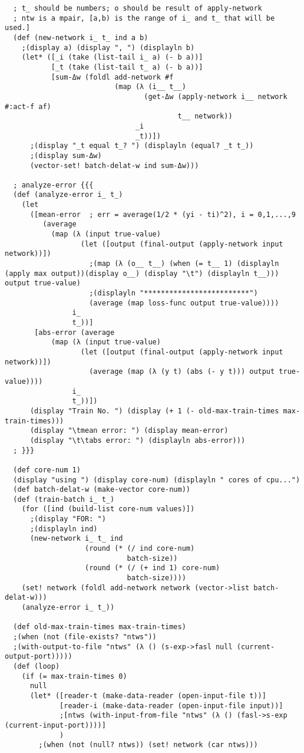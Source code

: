 \documentclass{article}
\begin{document}
\begin{lstlisting}
  ; t_ should be numbers; o should be result of apply-network
  ; ntw is a mpair, [a,b) is the range of i_ and t_ that will be used.]
  (def (new-network i_ t_ ind a b)
    ;(display a) (display ", ") (displayln b)
    (let* ([_i (take (list-tail i_ a) (- b a))]
           [_t (take (list-tail t_ a) (- b a))]
           [sum-Δw (foldl add-network #f
                          (map (λ (i__ t__)
                                 (get-Δw (apply-network i__ network #:act-f af)
                                         t__ network))
                               _i
                               _t))])
      ;(display "_t equal t_? ") (displayln (equal? _t t_))
      ;(display sum-Δw)
      (vector-set! batch-delat-w ind sum-Δw)))

  ; analyze-error {{{
  (def (analyze-error i_ t_)
    (let
      ([mean-error  ; err = average(1/2 * (yi - ti)^2), i = 0,1,...,9
         (average
           (map (λ (input true-value)
                  (let ([output (final-output (apply-network input network))])
                    ;(map (λ (o__ t__) (when (= t__ 1) (displayln (apply max output))(display o__) (display "\t") (displayln t__))) output true-value)
                    ;(displayln "*************************")
                    (average (map loss-func output true-value))))
                i_
                t_))]
       [abs-error (average
           (map (λ (input true-value)
                  (let ([output (final-output (apply-network input network))])
                    (average (map (λ (y t) (abs (- y t))) output true-value))))
                i_
                t_))])
      (display "Train No. ") (display (+ 1 (- old-max-train-times max-train-times)))
      (display "\tmean error: ") (display mean-error)
      (display "\t\tabs error: ") (displayln abs-error)))
  ; }}}

  (def core-num 1)
  (display "using ") (display core-num) (displayln " cores of cpu...")
  (def batch-delat-w (make-vector core-num))
  (def (train-batch i_ t_)
    (for ([ind (build-list core-num values)])
      ;(display "FOR: ")
      ;(displayln ind)
      (new-network i_ t_ ind
                   (round (* (/ ind core-num)
                             batch-size))
                   (round (* (/ (+ ind 1) core-num)
                             batch-size))))
    (set! network (foldl add-network network (vector->list batch-delat-w)))
    (analyze-error i_ t_))

  (def old-max-train-times max-train-times)
  ;(when (not (file-exists? "ntws"))
  ;(with-output-to-file "ntws" (λ () (s-exp->fasl null (current-output-port)))))
  (def (loop)
    (if (= max-train-times 0)
      null
      (let* ([reader-t (make-data-reader (open-input-file t))]
             [reader-i (make-data-reader (open-input-file input))]
             ;[ntws (with-input-from-file "ntws" (λ () (fasl->s-exp (current-input-port))))]
             )
        ;(when (not (null? ntws)) (set! network (car ntws)))


\end{lstlisting}
\end{document}
